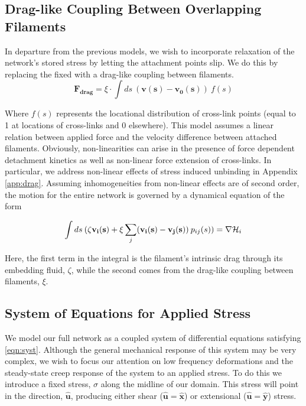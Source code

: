 \documentclass[pre,reprint]{revtex4-1}
\begin{document}
\subsection{Drag-like Coupling Between Overlapping Filaments}
\label{exp_drag}
In departure from the previous models, we wish to incorporate relaxation of the network's stored stress by letting the attachment points slip.  We do this by replacing the fixed with a drag-like coupling between filaments.
\begin{equation}
\mathbf{F_{drag}} = \xi \cdot \int ds \: (\mathbf{v(s)}-\mathbf{v_0(s)}) \: f(s)
\end{equation}

Where $f(s)$ represents the locational distribution of cross-link points (equal to 1 at locations of cross-links and 0 elsewhere).  This model assumes a linear relation between applied force and the velocity difference between attached filaments.  Obviously, non-linearities can arise in the presence of force dependent detachment kinetics as well as non-linear force extension of cross-links.  In particular, we address non-linear effects of stress induced unbinding in Appendix \ref{app:drag}.  Assuming inhomogeneities from non-linear effects are of second order, the motion for the entire network is governed by a dynamical equation of the form

\begin{equation}
\label{eqn:syst}
\int ds \: (\mathbf{\zeta v_i(s)} + \xi \sum _j(\mathbf{v_i(s)}-\mathbf{v_j(s)}) \: p_{ij}(s))= \nabla {\cal H}_i
\end{equation}

Here, the first term in the integral is the filament's intrinsic drag through its embedding fluid, $\zeta$, while the second comes from the drag-like coupling between filaments, $\xi$.  


\subsection{System of Equations for Applied Stress}
We model our full network as a coupled system of differential equations satisfying \ref{eqn:syst}.  Although the general mechanical response of this system may be very complex, we wish to focus our attention on low frequency deformations and the steady-state creep response of the system to an applied stress.  To do this we introduce a fixed stress, $\sigma$ along the midline of our domain.  This stress will point in the direction, $\mathbf{\hat{u}}$, producing either shear ($\mathbf{\hat{u}}=\mathbf{\hat{x}}$) or extensional ($\mathbf{\hat{u}}=\mathbf{\hat{y}}$) stress.
\end{document}
